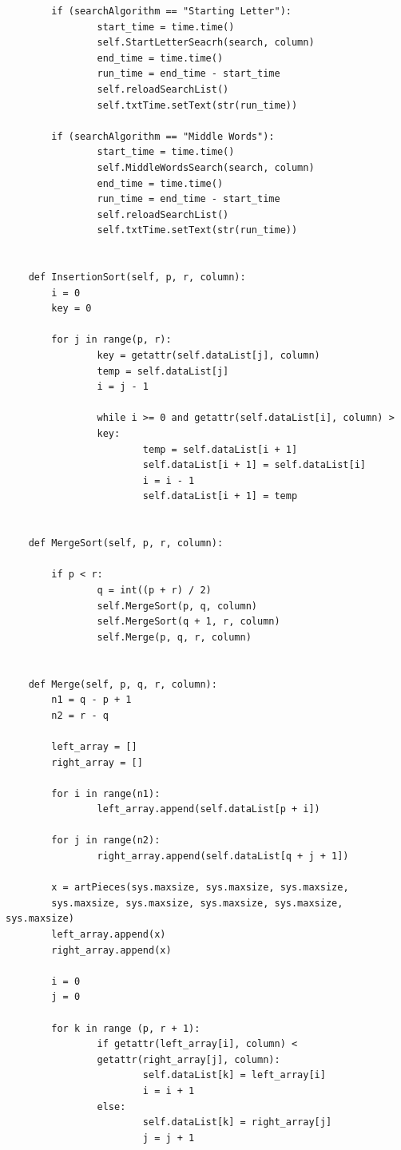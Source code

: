 \documentclass[12pt]{article}
\begin{document}
\begin{verbatim}
        if (searchAlgorithm == "Starting Letter"):
                start_time = time.time()
                self.StartLetterSeacrh(search, column)
                end_time = time.time()
                run_time = end_time - start_time
                self.reloadSearchList()
                self.txtTime.setText(str(run_time))

        if (searchAlgorithm == "Middle Words"):
                start_time = time.time()
                self.MiddleWordsSearch(search, column)
                end_time = time.time()
                run_time = end_time - start_time
                self.reloadSearchList()
                self.txtTime.setText(str(run_time))
        

    def InsertionSort(self, p, r, column):
        i = 0
        key = 0

        for j in range(p, r):
                key = getattr(self.dataList[j], column)
                temp = self.dataList[j]
                i = j - 1
                
                while i >= 0 and getattr(self.dataList[i], column) >
                key:
                        temp = self.dataList[i + 1]
                        self.dataList[i + 1] = self.dataList[i]
                        i = i - 1 
                        self.dataList[i + 1] = temp


    def MergeSort(self, p, r, column):
        
        if p < r:
                q = int((p + r) / 2)
                self.MergeSort(p, q, column)
                self.MergeSort(q + 1, r, column)
                self.Merge(p, q, r, column)
    
    
    def Merge(self, p, q, r, column):
        n1 = q - p + 1
        n2 = r - q

        left_array = []
        right_array = []
        
        for i in range(n1):
                left_array.append(self.dataList[p + i])

        for j in range(n2):
                right_array.append(self.dataList[q + j + 1])

        x = artPieces(sys.maxsize, sys.maxsize, sys.maxsize,
        sys.maxsize, sys.maxsize, sys.maxsize, sys.maxsize, sys.maxsize)
        left_array.append(x)
        right_array.append(x)
        
        i = 0
        j = 0
        
        for k in range (p, r + 1):
                if getattr(left_array[i], column) <
                getattr(right_array[j], column):
                        self.dataList[k] = left_array[i]
                        i = i + 1
                else:
                        self.dataList[k] = right_array[j]
                        j = j + 1 



\end{verbatim}
\end{document}
